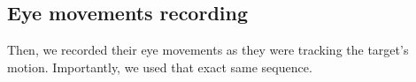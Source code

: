 \documentclass[12pt,english]{article}%
\begin{document}

\subsection{Eye movements recording}

%
%
%
Then, we recorded their eye movements as they were tracking the target's motion. Importantly, we used that exact same sequence.
\end{document}
